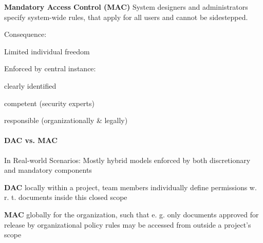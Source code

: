 \documentclass[a4paper]{article}
\renewcommand{\note}[2]{\begin{noteBox} \textbf{#1} #2 \end{noteBox}}
\begin{document}
\begin{multicols}{3}
    \note{Mandatory Access Control (MAC)}{System designers and administrators specify system-wide rules, that apply for all users and cannot be sidestepped.}
    Consequence:
    \begin{itemize*}
        \item Limited individual freedom
        \item Enforced by central instance:
        \begin{itemize*}
            \item clearly identified
            \item competent (security experts)
            \item responsible (organizationally \& legally)
        \end{itemize*}
    \end{itemize*}

    \paragraph{DAC vs. MAC}
    In Real-world Scenarios: Mostly hybrid models enforced by both discretionary and mandatory components
    \begin{itemize*}
        \item \textbf{DAC} locally within a project, team members individually define permissions w. r. t. documents inside this closed scope
        \item \textbf{MAC} globally for the organization, such that e. g. only documents approved for release by organizational policy rules may be accessed from outside a project’s scope
    \end{itemize*}


\end{multicols}
\end{document}
